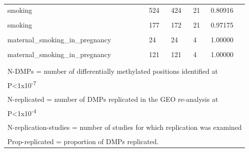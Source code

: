 \documentclass[11pt,oneside]{bristolthesis}
\begin{document}
\begin{table}
{\begin{tabular}[t]{lllll}
smoking & 524 & 424 & 21 & 0.80916\\
\cellcolor{gray!6}{smoking} & \cellcolor{gray!6}{192} & \cellcolor{gray!6}{0} & \cellcolor{gray!6}{21} & \cellcolor{gray!6}{0.00000}\\
smoking & 177 & 172 & 21 & 0.97175\\
\addlinespace
\cellcolor{gray!6}{maternal\_smoking\_in\_pregnancy} & \cellcolor{gray!6}{19} & \cellcolor{gray!6}{19} & \cellcolor{gray!6}{4} & \cellcolor{gray!6}{1.00000}\\
maternal\_smoking\_in\_pregnancy & 24 & 24 & 4 & 1.00000\\
\cellcolor{gray!6}{maternal\_smoking\_in\_pregnancy} & \cellcolor{gray!6}{1,591} & \cellcolor{gray!6}{413} & \cellcolor{gray!6}{4} & \cellcolor{gray!6}{0.25959}\\
maternal\_smoking\_in\_pregnancy & 121 & 121 & 4 & 1.00000\\
\cellcolor{gray!6}{maternal\_smoking\_in\_pregnancy} & \cellcolor{gray!6}{4} & \cellcolor{gray!6}{4} & \cellcolor{gray!6}{4} & \cellcolor{gray!6}{1.00000}\\
\bottomrule
\multicolumn{5}{l}{\textsuperscript{} N-DMPs = number of differentially methylated positions identified at}\\
\multicolumn{5}{l}{P<1x10\textsuperscript{-7}}\\
\multicolumn{5}{l}{\textsuperscript{} N-replicated = number of DMPs replicated in the GEO re-analysis at}\\
\multicolumn{5}{l}{P<1x10\textsuperscript{-4}}\\
\multicolumn{5}{l}{\textsuperscript{} N-replication-studies = number of studies for which replication was examined}\\
\multicolumn{5}{l}{\textsuperscript{} Prop-replicated = proportion of DMPs replicated.}\\
\end{tabular}}
\end{table}
\end{document}
